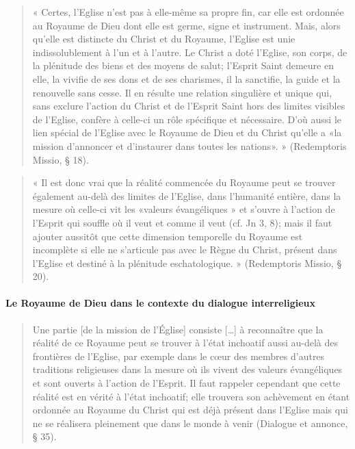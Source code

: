 \begin{quote}
    « Certes, l'Eglise n'est pas à elle-même sa propre fin, car elle est ordonnée au Royaume de Dieu dont elle est germe, signe et instrument. Mais, alors qu'elle est distincte du Christ et du Royaume, l'Eglise est unie indissolublement à l'un et à l'autre. Le Christ a doté l'Eglise, son corps, de la plénitude des biens et des moyens de salut; l'Esprit Saint demeure en elle, la vivifie de ses dons et de ses charismes, il la sanctifie, la guide et la renouvelle sans cesse. Il en résulte une relation singulière et unique qui, sans exclure l'action du Christ et de l'Esprit Saint hors des limites visibles de l'Eglise, confère à celle-ci un rôle spécifique et nécessaire. D'où aussi le lien spécial de l'Eglise avec le Royaume de Dieu et du Christ qu'elle a «la mission d'annoncer et d'instaurer dans toutes les nations». » (Redemptoris Missio, § 18).  
\end{quote}

\begin{quote}
    « Il est donc vrai que la réalité commencée du Royaume peut se trouver également au-delà des limites de l'Eglise, dans l'humanité entière, dans la mesure où celle-ci vit les «valeurs évangéliques » et s'ouvre à l'action de l'Esprit qui souffle où il veut et comme il veut (cf. Jn 3, 8); mais il faut ajouter aussitôt que cette dimension temporelle du Royaume est incomplète si elle ne s'articule pas avec le Règne du Christ, présent dans l'Eglise et destiné à la plénitude eschatologique. » (Redemptoris Missio, § 20). 
\end{quote}
    
\paragraph{Le Royaume de Dieu dans le contexte du dialogue interreligieux} 
\begin{quote}
    Une partie [de la mission de l’Église] consiste […] à reconnaître que la réalité de ce Royaume peut se trouver à l’état inchoatif aussi au-delà des frontières de l’Eglise, par exemple dans le cœur des membres d’autres traditions religieuses dans la mesure où ils vivent des valeurs évangéliques et sont ouverts à l’action de l’Esprit. Il faut rappeler cependant que cette réalité est en vérité à l’état inchoatif; elle trouvera son achèvement en étant ordonnée au Royaume du Christ qui est déjà présent dans l’Eglise mais qui ne se réalisera pleinement que dans le monde à venir (Dialogue et annonce,  § 35). 
\end{quote}
